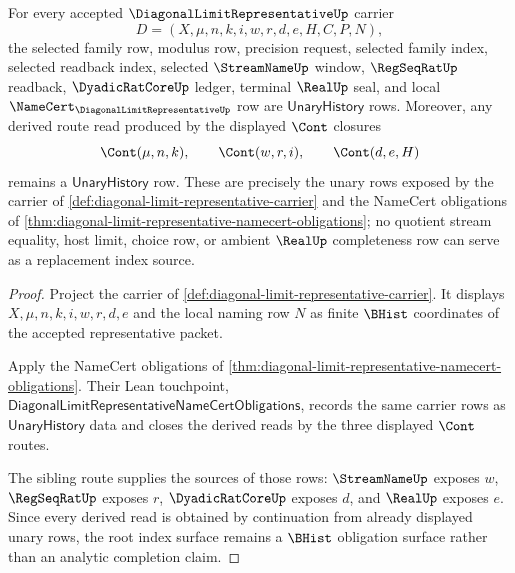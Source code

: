 \begin{theorem}
\label{thm:diagonal-limit-representative-index-unary-closure}
For every accepted $\DiagonalLimitRepresentativeUp$ carrier
$$
D=(X,\mu,n,k,i,w,r,d,e,H,C,P,N),
$$
the selected family row, modulus row, precision request, selected family index, selected readback index, selected $\StreamNameUp$ window, $\RegSeqRatUp$ readback, $\DyadicRatCoreUp$ ledger, terminal $\RealUp$ seal, and local $\NameCert_{\DiagonalLimitRepresentativeUp}$ row are $\mathsf{UnaryHistory}$ rows. Moreover, any derived route read produced by the displayed $\Cont$ closures
$$
\Cont(\mu,n,k),\qquad \Cont(w,r,i),\qquad \Cont(d,e,H)
$$
remains a $\mathsf{UnaryHistory}$ row. These are precisely the unary rows exposed by the carrier of \autoref{def:diagonal-limit-representative-carrier} and the NameCert obligations of \autoref{thm:diagonal-limit-representative-namecert-obligations}; no quotient stream equality, host limit, choice row, or ambient $\RealUp$ completeness row can serve as a replacement index source.
\end{theorem}
\begin{proof}
Project the carrier of \autoref{def:diagonal-limit-representative-carrier}. It displays $X,\mu,n,k,i,w,r,d,e$ and the local naming row $N$ as finite $\BHist$ coordinates of the accepted representative packet.

Apply the NameCert obligations of \autoref{thm:diagonal-limit-representative-namecert-obligations}. Their Lean touchpoint, $\mathsf{DiagonalLimitRepresentativeNameCertObligations}$, records the same carrier rows as $\mathsf{UnaryHistory}$ data and closes the derived reads by the three displayed $\Cont$ routes.

The sibling route supplies the sources of those rows: $\StreamNameUp$ exposes $w$, $\RegSeqRatUp$ exposes $r$, $\DyadicRatCoreUp$ exposes $d$, and $\RealUp$ exposes $e$. Since every derived read is obtained by continuation from already displayed unary rows, the root index surface remains a $\BHist$ obligation surface rather than an analytic completion claim.
\end{proof}

